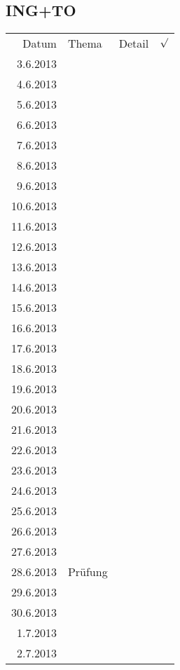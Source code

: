 \subsection{ING+TO}
\begin{tabular}{r l p{} l}
\rowcolor{lgray} Datum     & Thema         & Detail & $\surd$ \\
\rowcolor{white}  3.6.2013 &               &  &  \\
\rowcolor{lgray}  4.6.2013 &               &  &  \\
\rowcolor{white}  5.6.2013 &               &  &  \\
\rowcolor{lgray}  6.6.2013 &               &  &  \\
\rowcolor{white}  7.6.2013 &               &  &  \\
\rowcolor{lgray}  8.6.2013 &               &  &  \\
\rowcolor{white}  9.6.2013 &               &  &  \\
\rowcolor{lgray} 10.6.2013 &               &  &  \\
\rowcolor{white} 11.6.2013 &               &  &  \\
\rowcolor{lgray} 12.6.2013 &               &  &  \\
\rowcolor{white} 13.6.2013 &               &  &  \\
\rowcolor{lgray} 14.6.2013 &               &  &  \\
\rowcolor{white} 15.6.2013 &               &  &  \\
\rowcolor{lgray} 16.6.2013 &               &  &  \\
\rowcolor{white} 17.6.2013 &               &  &  \\
\rowcolor{lgray} 18.6.2013 &               &  &  \\
\rowcolor{white} 19.6.2013 &               &  &  \\
\rowcolor{lgray} 20.6.2013 &               &  &  \\
\rowcolor{white} 21.6.2013 &               &  &  \\
\rowcolor{lgray} 22.6.2013 &               &  &  \\
\rowcolor{white} 23.6.2013 &               &  &  \\
\rowcolor{lgray} 24.6.2013 &               &  &  \\
\rowcolor{white} 25.6.2013 &               &  &  \\
\rowcolor{lgray} 26.6.2013 &               &  &  \\
\rowcolor{white} 27.6.2013 &               &  &  \\
\rowcolor{lgray} 28.6.2013 & Prüfung       &  &  \\
\rowcolor{white} 29.6.2013 &               &  &  \\
\rowcolor{lgray} 30.6.2013 &               &  &  \\
\rowcolor{white}  1.7.2013 &               &  &  \\
\rowcolor{lgray}  2.7.2013 &               &  &  \\
\end{tabular}

